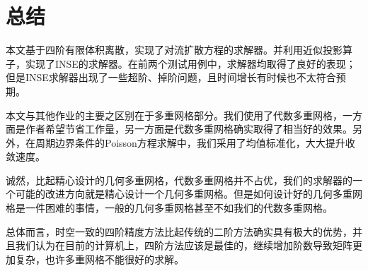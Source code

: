 \documentclass[lang=cn,10pt,bibend=bibtex]{elegantbook}
\begin{document}
\vspace{4em}

\chapter{总结}
\vspace{-1em}

本文基于四阶有限体积离散，实现了对流扩散方程的求解器。并利用近似投影算子，实现了INSE的求解器。在前两个测试用例中，求解器均取得了良好的表现；但是INSE求解器出现了一些超阶、掉阶问题，且时间增长有时候也不太符合预期。

本文与其他作业的主要之区别在于多重网格部分。我们使用了代数多重网格，一方面是作者希望节省工作量，另一方面是代数多重网格确实取得了相当好的效果。另外，在周期边界条件的Poisson方程求解中，我们采用了均值标准化，大大提升收敛速度。

诚然，比起精心设计的几何多重网格，代数多重网格并不占优，我们的求解器的一个可能的改进方向就是精心设计一个几何多重网格。但是如何设计好的几何多重网格是一件困难的事情，一般的几何多重网格甚至不如我们的代数多重网格。

总体而言，时空一致的四阶精度方法比起传统的二阶方法确实具有极大的优势，并且我们认为在目前的计算机上，四阶方法应该是最佳的，继续增加阶数导致矩阵更加复杂，也许多重网格不能很好的求解。

\vspace{3em}

\printbibliography[heading=bibintoc,title=\ebibname]
\end{document}
